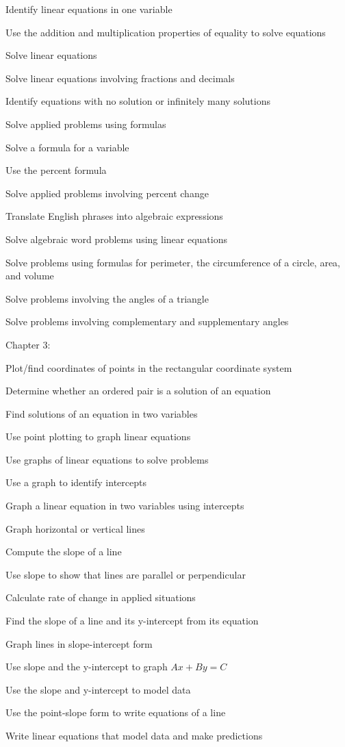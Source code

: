 \begin{alphalist}
    \item Identify linear equations in one variable
    \item Use the addition and multiplication properties of equality to solve equations
    \item Solve linear equations
    \item Solve linear equations involving fractions and decimals
    \item Identify equations with no solution or infinitely many solutions
    \item Solve applied problems using formulas
    \item Solve a formula for a variable
    \item Use the percent formula
    \item Solve applied problems involving percent change
    \item Translate English phrases into algebraic expressions
    \item Solve algebraic word problems using linear equations
    \item Solve problems using formulas for perimeter, the circumference of a circle, area, and volume
    \item Solve problems involving the angles of a triangle
    \item Solve problems involving complementary and supplementary angles
\end{alphalist}
Chapter 3:
 \begin{alphalist}
    \item Plot/find coordinates of points in the rectangular coordinate system
    \item Determine whether an ordered pair is a solution of an equation
    \item Find solutions of an equation in two variables
    \item Use point plotting to graph linear equations
    \item Use graphs of linear equations to solve problems
    \item Use a graph to identify intercepts
    \item Graph a linear equation in two variables using intercepts
    \item Graph horizontal or vertical lines
    \item Compute the slope of a line
    \item Use slope to show that lines are parallel or perpendicular
    \item Calculate rate of change in applied situations
    \item Find the slope of a line and its y-intercept from its equation
    \item Graph lines in slope-intercept form
    \item Use slope and the y-intercept to graph $Ax + By = C$
    \item Use the slope and y-intercept to model data
    \item Use the point-slope form to write equations of a line
    \item Write linear equations that model data and make predictions
 \end{alphalist}
